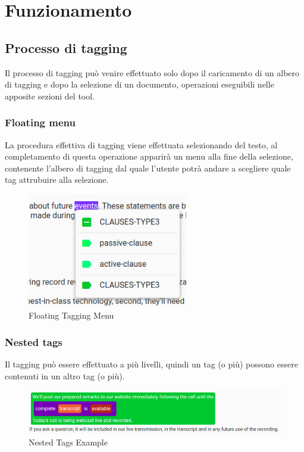 \documentclass[twoside]{supsistudent}
\begin{document}
\chapter{Funzionamento}

\section{Processo di tagging}

Il processo di tagging può venire effettuato solo dopo il caricamento di un 
albero di tagging e dopo la selezione di un documento, operazioni eseguibili
nelle apposite sezioni del tool. 

\subsection{Floating menu}

La procedura effettiva di tagging viene effettuata selezionando del testo, al
completamento di questa operazione apparirà un menu alla fine della selezione,
contenente l'albero di tagging dal quale l'utente potrà andare a scegliere
quale tag attrubuire alla selezione.

\begin{figure}[h!]
  \centering
  \includegraphics[width=7cm]{figures/floatingTag.png}
  \caption{Floating Tagging Menu}
  \label{fig:floatingTag}
\end{figure}

\pagebreak

\subsection{Nested tags}

Il tagging può essere effettuato a più livelli, quindi un tag (o più) possono
essere contenuti in un altro tag (o più).

\begin{figure}[h!]
  \includegraphics[width=\linewidth]{figures/nestedTags.png}
  \caption{Nested Tags Example}
  \label{fig:nestedTags}
\end{figure}
\end{document}
